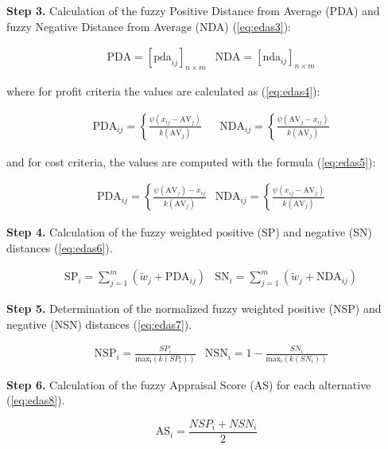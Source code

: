 \noindent \textbf{Step 3.} Calculation of the fuzzy Positive Distance from Average (PDA) and fuzzy Negative Distance from Average (NDA) (\ref{eq:edas3}):

\begin{equation}
\begin{aligned}
&\mathrm{PDA}=\left[\mathrm{pda}_{i j}\right]_{n \times m}
&\mathrm{NDA}=\left[\mathrm{nda}_{i j}\right]_{n \times m}
\end{aligned}
\label{eq:edas3}
\end{equation}

\noindent where for profit criteria the values are calculated as (\ref{eq:edas4}):

\begin{equation}
\begin{aligned}
& \mathrm{PDA}_{i j}=\left\{\frac{\psi\left(x_{i j}-\mathrm{AV}_j\right)}{k\left(\mathrm{AV}_j\right)}\right. & 
& \mathrm{NDA}_{i j}=\left\{\frac{\psi\left(\mathrm{AV}_j-x_{i j}\right)}{k\left(\mathrm{AV}_j\right)}\right.
\end{aligned}
\label{eq:edas4}
\end{equation}

\noindent and for cost criteria, the values are computed with the formula (\ref{eq:edas5}):

\begin{equation}
\begin{aligned}
& \mathrm{PDA}_{i j}=\left\{\frac{\psi\left(\mathrm{AV}_j\right)-x_{i j}}{k\left(\mathrm{AV}_j\right)}\right.
& \mathrm{NDA}_{i j}=\left\{\frac{\psi\left(x_{i j}-\mathrm{AV}_j\right)}{k\left(\mathrm{AV}_j\right)}\right.
\end{aligned}
\label{eq:edas5}
\end{equation}

\noindent \textbf{Step 4.} Calculation of the fuzzy weighted positive (SP) and negative (SN) distances (\ref{eq:edas6}).

\begin{equation}
\begin{aligned}
& \mathrm{SP}_i=\sum_{j=1}^m\left(\tilde{w}_j+\mathrm{PDA}_{i j}\right) 
& \mathrm{SN}_i=\sum_{j=1}^m\left(\tilde{w}_j+\mathrm{NDA}_{i j}\right) 
\end{aligned}
\label{eq:edas6}
\end{equation}

\noindent \textbf{Step 5.} Determination of the normalized fuzzy weighted positive (NSP) and negative (NSN) distances (\ref{eq:edas7}).

\begin{equation}
\begin{aligned}
& \mathrm{NSP}_i=\frac{SP_i}{\mathrm{max_i}(k(SP_i))} 
& \mathrm{NSN}_i= 1 - \frac{SN_i}{\mathrm{max_i}(k(SN_i))} 
\end{aligned}
\label{eq:edas7}
\end{equation}

\noindent \textbf{Step 6.} Calculation of the fuzzy Appraisal Score (AS) for each alternative (\ref{eq:edas8}).

\begin{equation}
\mathrm{AS}_i=\frac{NSP_i+NSN_i}{2} 
\label{eq:edas8}
\end{equation}
